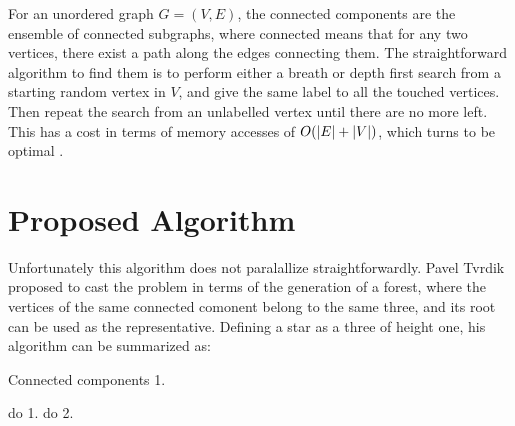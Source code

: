 %

For an unordered graph $G=(V,E)$, the connected components are the ensemble
of connected subgraphs, where connected means that for any two  vertices, there exist a path along the
 edges connecting them.
The straightforward algorithm to find them is to perform either a breath or depth first search from a starting
random vertex in $V$, and give the same label to all the touched vertices. Then repeat the search from an unlabelled vertex
until there are no more left.
This has a cost in terms of memory accesses of $O(\left| E \right| + \left| V \right|)$, which turns to be optimal \cite{Hopcroft}.

\section{Proposed Algorithm}\label{sec:yourmethod}
%
%

Unfortunately this algorithm does not paralallize straightforwardly. Pavel Tvrdik \cite{PCompClass}
proposed to cast the problem in terms of the generation of a forest, where the vertices of the same connected comonent belong
to the same three, and its root can be used as the representative. Defining a star as a three of height one,
his algorithm can be summarized as:

\begin{algorithm}
    \caption{Connected components 1.}
    \label{algorithm:cc1}
    \begin{algorithmic}[1]
        \State do 1.
        \State do 2.
    \end{algorithmic}
\end{algorithm}
